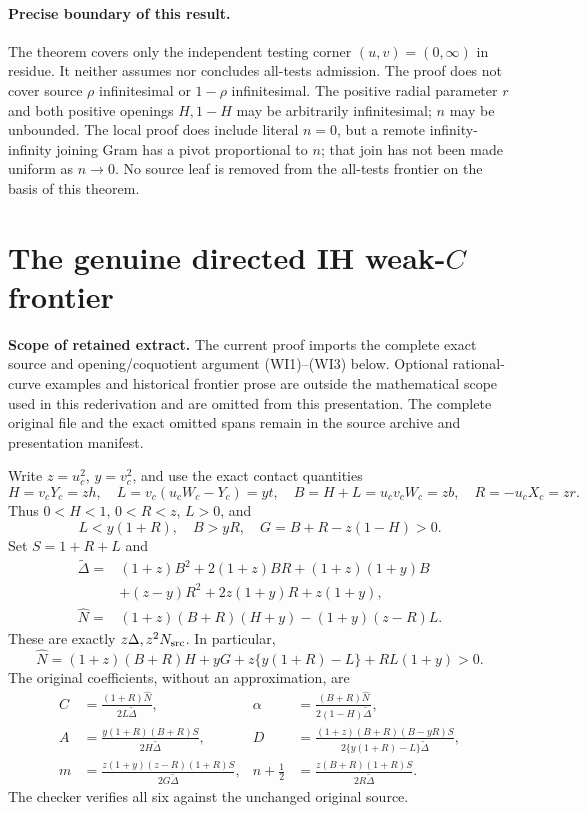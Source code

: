 \paragraph{Precise boundary of this result.}
The theorem covers only the independent testing corner $(u,v)=(0,\infty)$
in residue. It neither assumes nor concludes all-tests admission.
The proof does not cover source $\rho$ infinitesimal or
$1-\rho$ infinitesimal. The positive radial parameter $r$ and both
positive openings $H,1-H$ may be arbitrarily infinitesimal; $n$ may
be unbounded.
The local proof does include literal $n=0$, but a remote
infinity-infinity joining Gram has a pivot proportional to $n$;
that join has not been made uniform as $n\to0$. No source leaf is
removed from the all-tests frontier on the basis of this theorem.


\section{\texorpdfstring{The genuine directed IH weak-$C$ frontier}{The genuine directed IH weak-C frontier}}
\label{component:p93b05ea6ad1e}

\label{p93b05ea6ad1e:sec:c2-weak-ih-frontier}

\noindent\textbf{Scope of retained extract.} The current proof imports the complete exact source and opening/coquotient argument (WI1)--(WI3) below. Optional rational-curve examples and historical frontier prose are outside the mathematical scope used in this rederivation and are omitted from this presentation. The complete original file and the exact omitted spans remain in the source archive and presentation manifest.



Write $z=u_c^2$, $y=v_c^2$, and use the exact contact quantities
\[
 H=v_cY_c=zh,\quad L=v_c(u_cW_c-Y_c)=yt,\quad
 B=H+L=u_cv_cW_c=zb,\quad R=-u_cX_c=zr.
\]
Thus $0<H<1$, $0<R<z$, $L>0$, and
\[
 L<y(1+R),\quad B>yR,\quad
 G=B+R-z(1-H)>0.
\]
Set $S=1+R+L$ and
\begin{align*}
 \widetilde\Delta={}&(1+z)B^2+2(1+z)BR+(1+z)(1+y)B\\
 &+(z-y)R^2+2z(1+y)R+z(1+y),\\
 \widehat N={}&(1+z)(B+R)(H+y)-(1+y)(z-R)L.
\end{align*}
These are exactly $z\Delta,z^2N_{\rm src}$. In particular,
\[
 \widehat N=(1+z)(B+R)H+yG+z\{y(1+R)-L\}+RL(1+y)>0.
\]
The original coefficients, without an approximation, are
\begin{align*}
 C&=\frac{(1+R)\widehat N}{2L\widetilde\Delta},&
 \alpha&=\frac{(B+R)\widehat N}{2(1-H)\widetilde\Delta},\\
 A&=\frac{y(1+R)(B+R)S}{2H\widetilde\Delta},&
 D&=\frac{(1+z)(B+R)(B-yR)S}
 {2\{y(1+R)-L\}\widetilde\Delta},\\
 m&=\frac{z(1+y)(z-R)(1+R)S}{2G\widetilde\Delta},&
 n+\frac12&=\frac{z(B+R)(1+R)S}{2R\widetilde\Delta}.
                                                        \tag{WI1}
\end{align*}
The checker verifies all six against the unchanged original source.

